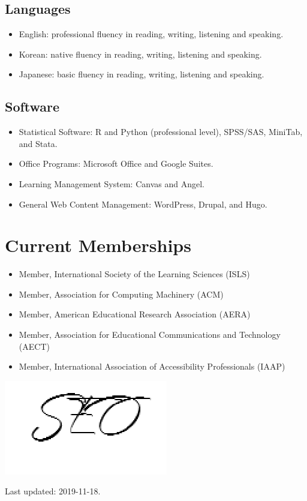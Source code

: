 \documentclass[11pt,a4paper,]{moderncv}
\providecommand{\tightlist}{%
	\setlength{\itemsep}{0pt}\setlength{\parskip}{0pt}}
\begin{document}
\hypertarget{languages}{%
\subsection{Languages}\label{languages}}

\begin{itemize}
\tightlist
\item
  English: professional fluency in reading, writing, listening and speaking.
\item
  Korean: native fluency in reading, writing, listening and speaking.
\item
  Japanese: basic fluency in reading, writing, listening and speaking.
\end{itemize}

\hypertarget{software}{%
\subsection{Software}\label{software}}

\begin{itemize}
\tightlist
\item
  Statistical Software: R and Python (professional level), SPSS/SAS, MiniTab, and Stata.
\item
  Office Programs: Microsoft Office and Google Suites.
\item
  Learning Management System: Canvas and Angel.
\item
  General Web Content Management: WordPress, Drupal, and Hugo.
\end{itemize}

\hypertarget{current-memberships}{%
\section{Current Memberships}\label{current-memberships}}

\begin{itemize}
\tightlist
\item
  Member, International Society of the Learning Sciences (ISLS)
\item
  Member, Association for Computing Machinery (ACM)
\item
  Member, American Educational Research Association (AERA)
\item
  Member, Association for Educational Communications and Technology (AECT)
\item
  Member, International Association of Accessibility Professionals (IAAP)
\end{itemize}

\includegraphics{"data/Signature.png"}

Last updated: 2019-11-18.
\end{document}
